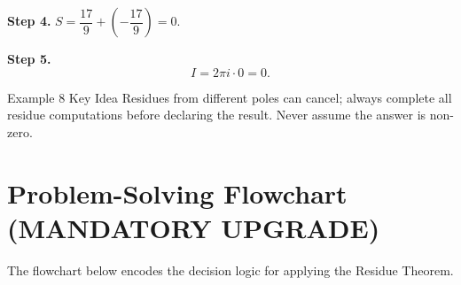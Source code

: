 \documentclass[12pt,a4paper]{article}
\begin{document}
\textbf{Step 4.} $S = \dfrac{17}{9} + \left(-\dfrac{17}{9}\right) = 0$.

\textbf{Step 5.}
\[
  I = 2\pi i \cdot 0 = \boxed{0}.
\]

\begin{learnbox}{Example 8 Key Idea}
Residues from different poles can cancel; always complete all residue computations
before declaring the result. Never assume the answer is non-zero.
\end{learnbox}

\section{Problem-Solving Flowchart (MANDATORY UPGRADE)}

The flowchart below encodes the decision logic for applying the Residue Theorem.
\end{document}
